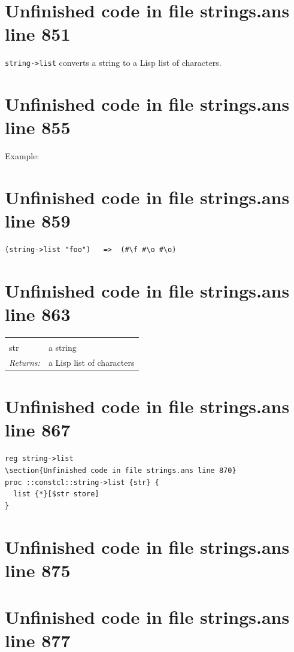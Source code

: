 \documentclass[twoside,9pt]{report}
\begin{document}
\section{Unfinished code in file strings.ans line 851}


\texttt{string->list} converts a string to a Lisp list of characters.

\section{Unfinished code in file strings.ans line 855}


Example:

\section{Unfinished code in file strings.ans line 859}
\begin{verbatim}
(string->list "foo")   =>  (#\f #\o #\o)
\end{verbatim}
\section{Unfinished code in file strings.ans line 863}
\noindent\begin{tabular}{ |p{1.9cm} p{8cm}| }
\hline
\rowcolor[HTML]{CCCCCC} \multicolumn{2}{|l|}{\bf string->list (public)} \\
str & a string \\
\textit{Returns:} & a Lisp list of characters \\
\hline
\end{tabular}
\section{Unfinished code in file strings.ans line 867}
\begin{lstlisting}
reg string->list
\section{Unfinished code in file strings.ans line 870}
proc ::constcl::string->list {str} {
  list {*}[$str store]
}
\end{lstlisting}
\section{Unfinished code in file strings.ans line 875}
\section{Unfinished code in file strings.ans line 877}
\end{document}
